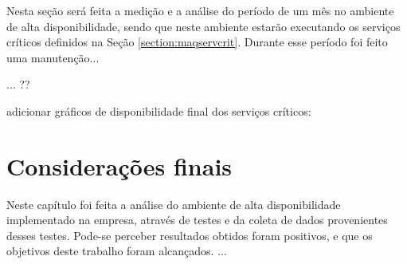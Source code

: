 Nesta seção será feita a medição e a análise do período de um mês no ambiente de alta disponibilidade, sendo que neste ambiente estarão executando 
os serviços críticos definidos na Seção \ref{section:maqservcrit}.
Durante esse período foi feito uma manutenção...

... ??

adicionar gráficos de disponibilidade final dos serviços críticos:



\section{Considerações finais}

Neste capítulo foi feita a análise do ambiente de alta disponibilidade implementado na empresa, através de testes e da coleta de dados
provenientes desses testes. Pode-se perceber resultados obtidos foram positivos, e que os objetivos deste trabalho foram alcançados. 
...
